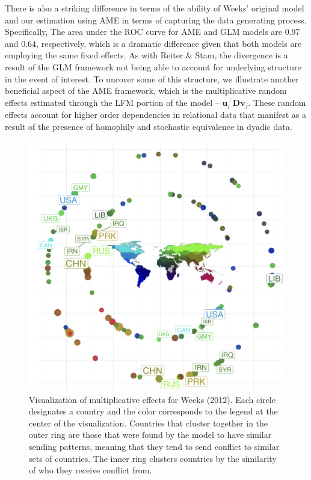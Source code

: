 There is also a striking difference in terms of the ability of Weeks' original model and our estimation using AME in terms of capturing the data generating process. Specifically, The area under the ROC curve for AME and GLM models are 0.97 and 0.64, respectively, which is a dramatic difference given that both models are employing the same fixed effects. As with Reiter \& Stam, the divergence is a result of the GLM framework not being able to account for underlying structure in the event of interest. To uncover some of this structure, we illustrate another beneficial aspect of the AME framework, which is the multiplicative random effects estimated through the LFM portion of the model -- $\mathbf{u}_{i}^{\top} \mathbf{D} \mathbf{v}_{j}$. These random effects account for higher order dependencies in relational data that manifest as a result of the presence of homophily and stochastic equivalence in dyadic data. 

\begin{figure}[!h]
	\includegraphics[width=\textwidth]{graphics/weeks_circPlot.png}
	\caption{ Visualization of multiplicative effects for Weeks (2012). Each circle designates a country and the color corresponds to the legend at the center of the visualization. Countries that cluster together in the outer ring are those that were found by the model to have similar sending patterns, meaning that they tend to send conflict to similar sets of countries. The inner ring clusters countries by the similarity of who they receive conflict from. 
	}
	\label{fig:weekscirc}
\end{figure}
\FloatBarrier

